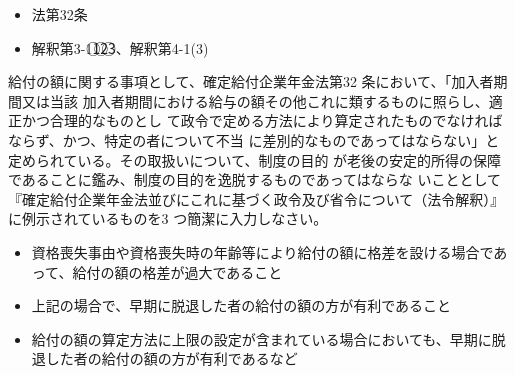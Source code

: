 \begin{InyouJobunbox}
  \begin{itemize}
    \item 法第32条
    \item 解釈第3-1\textcircled{1}\textcircled{2}\textcircled{3}、解釈第4-1(3)
  \end{itemize}
\end{InyouJobunbox}

\begin{shortanswer}[年金1 2022 問題2(1)ア]
  給付の額に関する事項として、確定給付企業年金法第32 条において、「加入者期間又は当該
加入者期間における給与の額その他これに類するものに照らし、適正かつ合理的なものとし
て政令で定める方法により算定されたものでなければならず、かつ、特定の者について不当
に差別的なものであってはならない」と定められている。その取扱いについて、制度の目的
が老後の安定的所得の保障であることに鑑み、制度の目的を逸脱するものであってはならな
いこととして『確定給付企業年金法並びにこれに基づく政令及び省令について（法令解釈）』
に例示されているものを3 つ簡潔に入力しなさい。
\end{shortanswer}

\begin{answerbox}
  \begin{itemize}
    \item 資格喪失事由や資格喪失時の年齢等により給付の額に格差を設ける場合であって、給付の額の格差が過大であること
    \item 上記の場合で、早期に脱退した者の給付の額の方が有利であること
    \item 給付の額の算定方法に上限の設定が含まれている場合においても、早期に脱退した者の給付の額の方が有利であるなど
  \end{itemize}
\end{answerbox}



